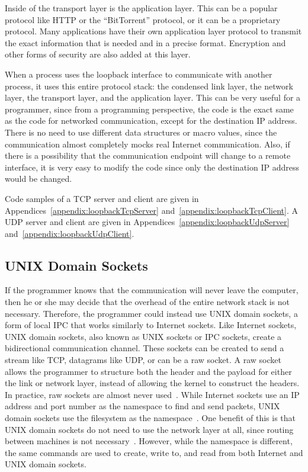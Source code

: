 Inside of the transport layer is the application layer.  This can be a popular protocol like HTTP or the ``BitTorrent'' protocol, or it can be a proprietary protocol.  Many applications have their own application layer protocol to transmit the exact information that is needed and in a precise format.  Encryption and other forms of security are also added at this layer.

When a process uses the loopback interface to communicate with another process, it uses this entire protocol stack: the condensed link layer, the network layer, the transport layer, and the application layer.  This can be very useful for a programmer, since from a programming perspective, the code is the exact same as the code for networked communication, except for the destination IP address.  There is no need to use different data structures or macro values, since the communication almost completely mocks real Internet communication.  Also, if there is a possibility that the communication endpoint will change to a remote interface, it is very easy to modify the code since only the destination IP address would be changed.

Code samples of a TCP server and client are given in Appendices~\ref{appendix:loopbackTcpServer} and~\ref{appendix:loopbackTcpClient}.  A UDP server and client are given in Appendices~\ref{appendix:loopbackUdpServer} and~\ref{appendix:loopbackUdpClient}.

\subsection{UNIX Domain Sockets}
\label{sec:unixDomainSockets}
If the programmer knows that the communication will never leave the computer, then he or she may decide that the overhead of the entire network stack is not necessary.  Therefore, the programmer could instead use UNIX domain sockets, a form of local IPC that works similarly to Internet sockets.  Like Internet sockets, UNIX domain sockets, also known as UNIX sockets or IPC sockets, create a bidirectional communication channel.  These sockets can be created to send a stream like TCP, datagrams like UDP, or can be a raw socket.  A raw socket allows the programmer to structure both the header and the payload for either the link or network layer, instead of allowing the kernel to construct the headers.  In practice, raw sockets are almost never used~\cite[p 229--230]{Stevens:1996:TIT:233130}.  While Internet sockets use an IP address and port number as the namespace to find and send packets, UNIX domain sockets use the filesystem as the namespace~\cite[p 231]{Stevens:1996:TIT:233130}.  One benefit of this is that UNIX domain sockets do not need to use the network layer at all, since routing between machines is not necessary~\cite[p 753]{mckusick_neville-neil_watson_2015}.  However, while the namespace is different, the same commands are used to create, write to, and read from both Internet and UNIX domain sockets.

